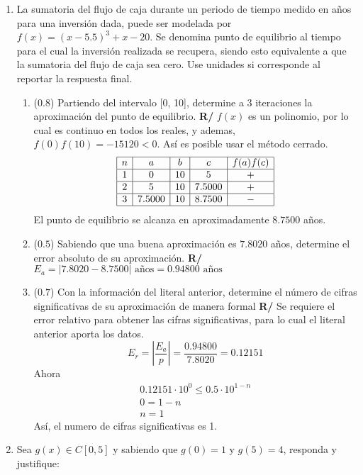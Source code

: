 \documentclass[12pt]{article}
\begin{document}
\begin{enumerate}[leftmargin=*,widest=9]
\begin{enumerate}[label=\alph*]
    \end{enumerate}
    \item La sumatoria del flujo de caja durante un periodo de tiempo medido en años para una inversión dada, puede ser modelada por \(f(x) = (x-5.5)^3 + x - 20\). Se denomina punto de equilibrio al tiempo para el cual la inversión realizada se recupera, siendo esto equivalente a que la sumatoria del flujo de caja sea cero. Use unidades si corresponde al reportar la respuesta final.
    \begin{enumerate}[label=\alph*]
    \item (\(0.8\)) Partiendo del intervalo [0, 10], determine a 3 iteraciones la aproximación del punto de equilibrio.
\textbf{R/} \(f(x)\) es un polinomio, por lo cual es continuo en todos los reales, y ademas, \(f(0)f(10)= -15120 < 0\). Así es posible usar el método cerrado.
\[
\begin{array}{|c|c|c|c|c|}
  \hline
  n & a & b & c & f(a)f(c)\\
  \hline
  1 & 0 & 10 & 5 & + \\
  \hline
  2 & 5 & 10 & 7.5000 & + \\
  \hline
  3 & 7.5000 & 10 & 8.7500 & - \\
  \hline
 \end{array}
\]
El punto de equilibrio se alcanza en aproximadamente \(8.7500\) años.
    \item (\(0.5\)) Sabiendo que una buena aproximación es \(7.8020\) años, determine el error absoluto de su aproximación.
\textbf{R/} \(E_a = |7.8020 - 8.7500| \text{ años} = 0.94800 \text{ años}\)
    \item (\(0.7\)) Con la información del literal anterior, determine el número de cifras significativas de su aproximación de manera formal
\textbf{R/} Se requiere el error relativo para obtener las cifras significativas, para lo cual el literal anterior aporta los datos.
\[E_r = \left| \frac{E_a}{p}\right| = \frac{0.94800}{7.8020} = 0.12151\]
Ahora
\begin{eqnarray*}
0.12151 \cdot 10^0 \leq 0.5 \cdot 10^{1-n} \\ 0 = 1-n \\ n = 1
\end{eqnarray*}
Así, el numero de cifras significativas es 1.
\end{enumerate}
   \item Sea \(g(x) \in C[0, 5]\) y sabiendo que \(g(0)= 1\) y \(g(5)=4\), responda y justifique:
   \begin{enumerate}[label=\alph*]

\end{enumerate}
\end{enumerate}
\end{document}
